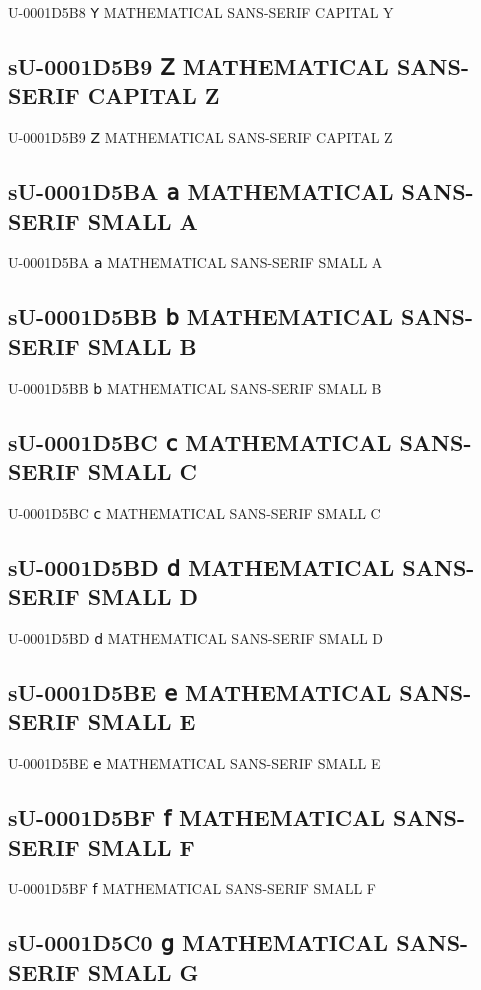 U-0001D5B8 𝖸 MATHEMATICAL SANS-SERIF CAPITAL Y

\subsection{sU-0001D5B9 𝖹 MATHEMATICAL SANS-SERIF CAPITAL Z}

U-0001D5B9 𝖹 MATHEMATICAL SANS-SERIF CAPITAL Z

\subsection{sU-0001D5BA 𝖺 MATHEMATICAL SANS-SERIF SMALL A}

U-0001D5BA 𝖺 MATHEMATICAL SANS-SERIF SMALL A

\subsection{sU-0001D5BB 𝖻 MATHEMATICAL SANS-SERIF SMALL B}

U-0001D5BB 𝖻 MATHEMATICAL SANS-SERIF SMALL B

\subsection{sU-0001D5BC 𝖼 MATHEMATICAL SANS-SERIF SMALL C}

U-0001D5BC 𝖼 MATHEMATICAL SANS-SERIF SMALL C

\subsection{sU-0001D5BD 𝖽 MATHEMATICAL SANS-SERIF SMALL D}

U-0001D5BD 𝖽 MATHEMATICAL SANS-SERIF SMALL D

\subsection{sU-0001D5BE 𝖾 MATHEMATICAL SANS-SERIF SMALL E}

U-0001D5BE 𝖾 MATHEMATICAL SANS-SERIF SMALL E

\subsection{sU-0001D5BF 𝖿 MATHEMATICAL SANS-SERIF SMALL F}

U-0001D5BF 𝖿 MATHEMATICAL SANS-SERIF SMALL F

\subsection{sU-0001D5C0 𝗀 MATHEMATICAL SANS-SERIF SMALL G}

